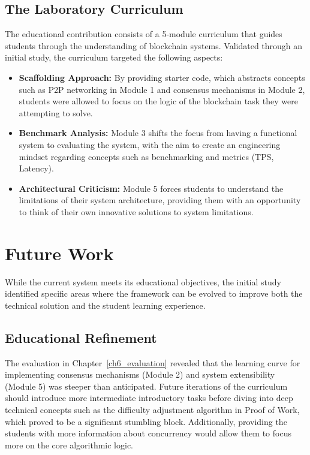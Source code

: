 \subsection{The Laboratory Curriculum}
The educational contribution consists of a 5-module curriculum that guides students through the understanding of blockchain systems. Validated through an initial study, the curriculum targeted the following aspects:
\begin{itemize}
    \item \textbf{Scaffolding Approach:} By providing starter code, which abstracts concepts such as P2P networking in Module 1 and consensus mechanisms in Module 2, students were allowed to focus on the logic of the blockchain task they were attempting to solve.
    \item \textbf{Benchmark Analysis:} Module 3 shifts the focus from having a functional system to evaluating the system, with the aim to create an engineering mindset regarding concepts such as benchmarking and metrics (TPS, Latency).
    \item \textbf{Architectural Criticism:} Module 5 forces students to understand the limitations of their system architecture, providing them with an opportunity to think of their own innovative solutions to system limitations.
\end{itemize}

\section{Future Work} \label{sec:future_work}
While the current system meets its educational objectives, the initial study identified specific areas where the framework can be evolved to improve both the technical solution and the student learning experience.

\subsection{Educational Refinement}
The evaluation in Chapter~\ref{ch6_evaluation} revealed that the learning curve for implementing consensus mechanisms (Module 2) and system extensibility (Module 5) was steeper than anticipated. Future iterations of the curriculum should introduce more intermediate introductory tasks before diving into deep technical concepts such as the difficulty adjustment algorithm in Proof of Work, which proved to be a significant stumbling block. Additionally, providing the students with more information about concurrency would allow them to focus more on the core algorithmic logic.

